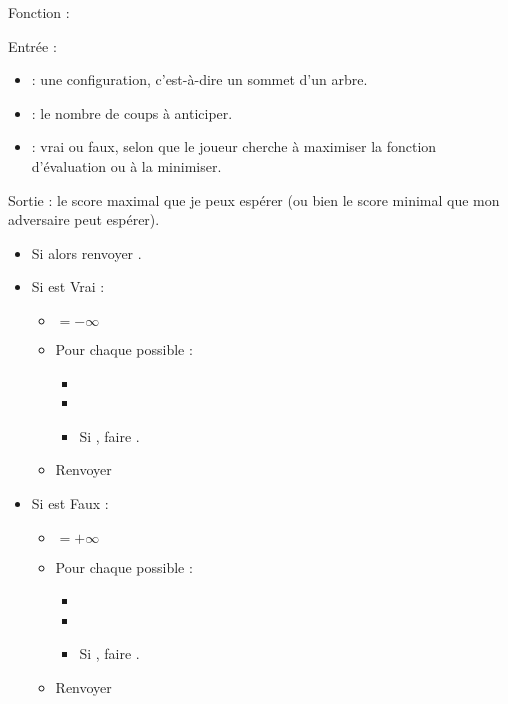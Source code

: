 \documentclass[11pt,class=report,crop=false]{standalone}
\begin{document}
\begin{algorithme}
	Fonction : 
	
	Entrée : 
	\begin{itemize}
		\item {} : une configuration, c'est-à-dire un sommet d'un arbre.
	    \item {} : le nombre de coups à anticiper.
	    \item {} : vrai ou faux, selon que le joueur cherche à maximiser la fonction d'évaluation ou à la minimiser.
    \end{itemize}   

	Sortie : le score maximal que je peux espérer (ou bien le score minimal que mon adversaire peut espérer).
	
	\begin{itemize}
		\item Si  alors renvoyer .
		
		\item Si  est Vrai :
		\begin{itemize}
			\item {} $= -\infty$		
			\item Pour chaque  possible :
		    \begin{itemize}			
				\item {}
				\item {}
				\item Si , faire .
		    \end{itemize}	    	
			\item Renvoyer 
	    \end{itemize}
    			
		\item Si  est Faux :
		\begin{itemize}
			\item {} $= +\infty$		
			\item Pour chaque  possible :
			\begin{itemize}			
				\item {}
				\item {}
					\item Si , faire .
			\end{itemize}	
				\item Renvoyer 
	    \end{itemize}		
					
	\end{itemize}  
\end{algorithme}
\end{document}
